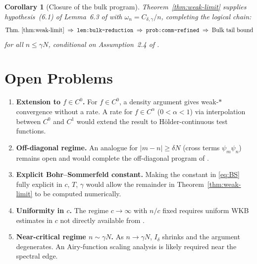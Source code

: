 \documentclass[12pt,a4paper]{amsart}
\newtheorem{corollary}[theorem]{Corollary}
\begin{document}
\begin{corollary}[Closure of the bulk program]%
\label{cor:bulk-program-closed}
Theorem~\ref{thm:weak-limit} supplies hypothesis~(6.1) of
Lemma~6.3 of \cite{PaperIII} with
$\omega_n = C_{\delta,\gamma}/n$,
completing the logical chain:
\[
  \text{Thm.~\ref{thm:weak-limit}}
  \;\Rightarrow\; \texttt{lem:bulk-reduction}
  \;\Rightarrow\; \texttt{prob:comm-refined}
  \;\Rightarrow\; \text{Bulk tail bound}
\]
for all $n \le \gamma N$,
conditional on Assumption~2.4 of \cite{PaperIII}.
\end{corollary}

\section{Open Problems}\label{sec:open}

\begin{enumerate}[(P1)]
  \item \textbf{Extension to $f \in C^0$.}
  For $f \in C^0$, a density argument gives weak-$*$
  convergence without a rate.
  A rate for $f \in C^\alpha$ ($0 < \alpha < 1$)
  via interpolation between $C^0$ and $C^1$ would extend
  the result to H\"older-continuous test functions.

  \item \textbf{Off-diagonal regime.}
  An analogue for $|m-n| \ge \delta N$
  (cross terms $\psi_m\psi_n$) remains open
  and would complete the off-diagonal program of
  \cite{PaperIII}.

  \item \textbf{Explicit Bohr--Sommerfeld constant.}
  Making the constant in \eqref{eq:BS} fully explicit
  in $c$, $T$, $\gamma$ would allow the remainder in
  Theorem~\ref{thm:weak-limit} to be computed numerically.

  \item \textbf{Uniformity in $c$.}
  The regime $c \to \infty$ with $n/c$ fixed requires
  uniform WKB estimates in $c$ not directly available
  from \cite{OsipovRokhlinXiao}.

  \item \textbf{Near-critical regime $n \sim \gamma N$.}
  As $n \to \gamma N$, $I_\delta$ shrinks and the argument
  degenerates. An Airy-function scaling analysis is likely
  required near the spectral edge.
\end{enumerate}
\end{document}
